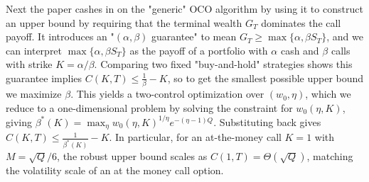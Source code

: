\documentclass[12pt]{article}
\begin{document}
Next the paper cashes in on the "generic" OCO algorithm by using it to construct an upper bound by requiring that the terminal wealth $G_T$ dominates the call payoff. It introduces an "$(\alpha,\beta)$ guarantee" to mean $G_T \ge \max\{\alpha,\beta S_T\}$, and we can interpret $\max\{\alpha,\beta S_T\}$ as the payoff of a portfolio with $\alpha$ cash and $\beta$ calls with strike $K=\alpha/\beta$. Comparing two fixed "buy-and-hold" strategies shows this guarantee implies $C(K,T) \le \frac{1}{\beta} - K$, so to get the smallest possible upper bound we maximize $\beta$. This yields a two-control optimization over $(w_0,\eta)$, which we reduce to a one-dimensional problem by solving the constraint for $w_0(\eta,K)$, giving $\beta^*(K)=\max_\eta w_0(\eta,K)^{1/\eta} e^{-(\eta-1)Q}$. Substituting back gives $C(K,T) \le \frac{1}{\beta^*(K)} - K$. In particular, for an at-the-money call $K=1$ with $M=\sqrt{Q}/6$, the robust upper bound scales as $C(1,T)=\Theta(\sqrt{Q})$, matching the volatility scale of an at the money call option.
\end{document}
